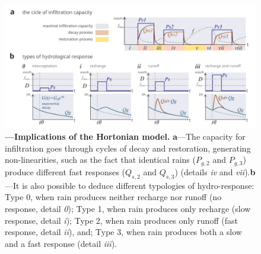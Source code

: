\documentclass[./main_en.tex]{subfiles}
\begin{document}
\begin{figure}[t!] 
\centering				
\includegraphics[width=0.98\linewidth]{figs/fig_horton2_en.jpg}		
\caption[Implications of the Hortonian \gls{model}]
{\textbf{---\;Implications of the Hortonian \gls{model}.}
    \textbf{a}\;---\;The capacity for \gls{infiltration} goes through cycles of decay and restoration, generating non-linearities, such as the fact that identical rains ($P_{g,2}$ and $P_{g,3}$) produce different fast responses ($Q_{s,2}$ and $Q_{s,3}$) (details \textrm{\textit{iv}} and \textrm{\textit{vii}}).\;\textbf{b}\;---\;It is also possible to deduce different typologies of \gls{hydro-response}: Type 0, when rain produces neither recharge nor runoff (no response, detail \textrm{\textit{0}}); Type 1, when rain produces only recharge (slow response, detail \textrm{\textit{i}}); Type 2, when rain produces only runoff (fast response, detail \textrm{\textit{ii}}), and; Type 3, when rain produces both a slow and a fast response (detail \textrm{\textit{iii}}).
}
\label{fig:hydro:horton2} 		
\end{figure}
\end{document}
